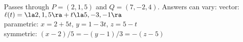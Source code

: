 {Passes through $P=(2,1,5)$ and $Q = (7,-2,4)$.
}
{Answers can vary:
vector: $\ell(t) = \la 2,1,5\ra + t\la 5,-3,-1\ra$\\
parametric: $x= 2+5t$, $y=1-3t$, $z = 5-t$\\
symmetric: $(x-2)/5 =-(y-1)/3 = -(z-5)$
}

